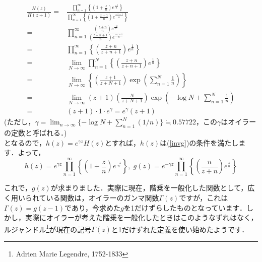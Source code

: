 \documentclass[./main]{subfile}
\begin{document}
\begin{align*}
\frac{H(z)}{H(z+1)}=&\frac{\prod_{n=1}^{\infty}\left\{\left(1+\frac{z}{n}\right)e^{\frac{-z}{n}}\right\}}{\prod_{n=1}^{\infty}\left\{\left(1+\frac{z+1}{n}\right)e^{\frac{-z-1}{n}}\right\}}\\
=&\prod_{n=1}^{\infty}\frac{\left(\frac{z+n}{n}\right)e^{\frac{-z}{n}}}{\left(\frac{z+n+1}{n}\right)e^{\frac{-z-1}{n}}}\\
=&\prod_{n=1}^{\infty}\left\{\left(\frac{z+n}{z+n+1}\right)e^{\frac{1}{n}}\right\}\\
=&\lim_{N\to\infty}\prod_{n=1}^{N}\left\{\left(\frac{z+n}{z+n+1}\right)e^{\frac{1}{n}}\right\}\\
=&\lim_{N\to\infty}\left\{\left(\frac{z+1}{z+N+1}\right)\exp\left(\sum_{n=1}^N{\frac{1}{n}}\right)\right\}\\
=&\lim_{N\to\infty}(z+1)\left(\frac{N}{z+N+1}\right)\exp\left(-\log N+\sum_{n=1}^N\frac{1}{n}\right)\\
=&(z+1)\cdot 1\cdot e^{\gamma}=e^{\gamma}(z+1)
\end{align*}
(ただし，$\gamma=\lim_{n\to\infty}\{-\log N+\sum_{n=1}^N(1/n)\}\fallingdotseq 0.57722$，この$\gamma$はオイラーの定数と呼ばれる．)\\
となるので，$h(z)=e^{\gamma z}H(z)$とすれば，$h(z)$は(\ref{invg})の条件を満たします．よって，
\[
h(z)=e^{\gamma z}\prod_{n=1}^{\infty}\left\{\left(1+\frac{z}{n}\right)e^{\frac{-z}{n}}\right\},\;g(z)=e^{-\gamma z}\prod_{n=1}^{\infty}\left\{\left(\frac{n}{z+n}\right)e^{\frac{z}{n}}\right\}
\]

これで，$g(z)$が求まりました．実際に現在，階乗を一般化した関数として，広く用いられている関数は，オイラーのガンマ関数$\Gamma(z)$ですが，これは$\Gamma(z)=g(z-1)$であり，今求めた$g$を1だけずらしたものとなっています．しかし，実際にオイラーが考えた階乗を一般化したときはこのようなずれはなく，ルジャンドル\footnote{Adrien Marie Legendre, 1752-1833}が現在の記号$\Gamma(z)$と1だけずれた定義を使い始めたようです．
\end{document}

